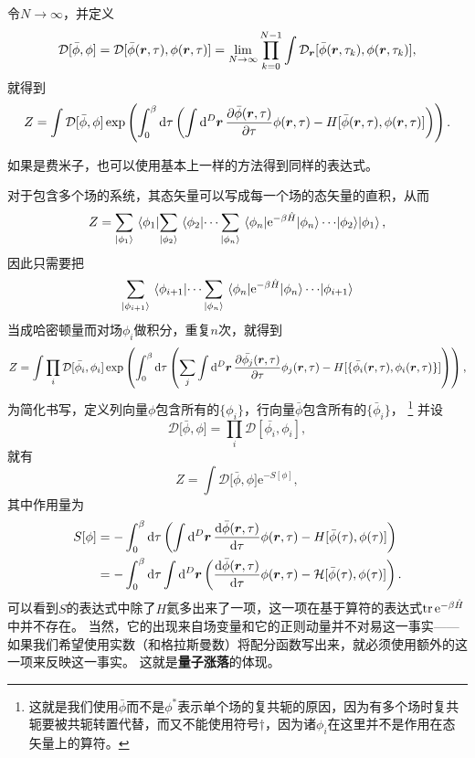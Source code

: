 \documentclass[hyperref, UTF8, a4paper]{ctexart}
\newcommand*{\ee}{\mathrm{e}}
\newcommand*{\fd}[1]{\mathcal{D}{#1}}
\begin{document}
令$N \to \infty$，并定义
\begin{equation}
    \mathcal{D} [\bar{\phi}, \phi] = \mathcal{D} [\bar{\phi}(\vb*{r}, \tau), \phi(\vb*{r}, \tau)] = \lim_{N \to \infty} \prod_{k=0}^{N-1} \int \mathcal{D}_{\vb*{r}}[ \bar{\phi}(\vb*{r}, \tau_k), \phi(\vb*{r}, \tau_k) ],
\end{equation}
就得到
\begin{equation}
    Z = \int \fd{[\bar{\phi}, \phi]} \exp \left( \int_0^\beta \dd{\tau} \left( \int \dd[D]{\vb*{r}} \pdv{\bar{\phi}(\vb*{r}, \tau)}{\tau} \phi(\vb*{r}, \tau) - H[\bar{\phi}(\vb*{r}, \tau), \phi(\vb*{r}, \tau)] \right) \right).
    \label{eq:one-field-partition-function}
\end{equation}

如果是费米子，也可以使用基本上一样的方法得到同样的表达式。

对于包含多个场的系统，其态矢量可以写成每一个场的态矢量的直积，从而
\[
    Z = \sum_{\ket{\phi_1}} \mel{\phi_1}{  \sum_{\ket{\phi_2}} \mel{\phi_2}{\cdots \sum_{\ket{\phi_n}} \mel{\phi_n}{\ee^{-\beta \hat{H}}}{\phi_n} \cdots}{\phi_2} }{\phi_1},
\]
因此只需要把
\[
    \sum_{\ket{\phi_{i+1}}} \mel{\phi_{i+1}}{\cdots \sum_{\ket{\phi_n}} \mel{\phi_n}{\ee^{-\beta \hat{H}}}{\phi_n} \cdots}{\phi_{i+1}}
\]
当成哈密顿量而对场$\phi_i$做积分，重复$n$次，就得到
\[
    Z = \int \prod_i \fd{[\bar{\phi_i}, \phi_i]} \exp \left( \int_0^\beta \dd{\tau} \left( \sum_j \int \dd[D]{\vb*{r}} \pdv{\bar{\phi_j}(\vb*{r}, \tau)}{\tau} \phi_j(\vb*{r}, \tau) - H[\{\bar{\phi_i}(\vb*{r}, \tau), \phi_i(\vb*{r}, \tau)\}] \right) \right),
\]
为简化书写，定义列向量$\phi$包含所有的$\{\phi_i\}$，行向量$\bar{\phi}$包含所有的$\{\bar{\phi}_i\}$，%
\footnote{这就是我们使用$\bar{\phi}$而不是$\phi^*$表示单个场的复共轭的原因，因为有多个场时复共轭要被共轭转置代替，而又不能使用符号$\dagger$，因为诸$\phi_i$在这里并不是作用在态矢量上的算符。}%
并设
\begin{equation}
    \fd[\bar{\phi}, \phi] = \prod_i \fd{[\bar{\phi_i}, \phi_i]},
\end{equation}
就有
\begin{equation}
    Z = \int \fd[\bar{\phi}, \phi] \ee^{ - S[\phi]},
\end{equation}
其中作用量为
\begin{equation}
    \begin{aligned}
        S[\phi] &= - \int_0^\beta \dd{\tau} \left( \int \dd[D]{\vb*{r}} \dv{\bar{\phi}(\vb*{r}, \tau)}{\tau} \phi(\vb*{r}, \tau) - H[\bar{\phi}(\tau), \phi(\tau)] \right) \\
        &= - \int_0^\beta \dd{\tau} \int \dd[D]{\vb*{r}} \left( \dv{\bar{\phi}(\vb*{r}, \tau)}{\tau} \phi(\vb*{r}, \tau) - \mathcal{H}[\bar{\phi}(\tau), \phi(\tau)] \right).
    \end{aligned}
\end{equation}
可以看到$S$的表达式中除了$H$氦多出来了一项，这一项在基于算符的表达式$\trace \ee^{-\beta \hat{H}}$中并不存在。
当然，它的出现来自场变量和它的正则动量并不对易这一事实——如果我们希望使用实数（和格拉斯曼数）将配分函数写出来，就必须使用额外的这一项来反映这一事实。
这就是\textbf{量子涨落}的体现。
\end{document}
